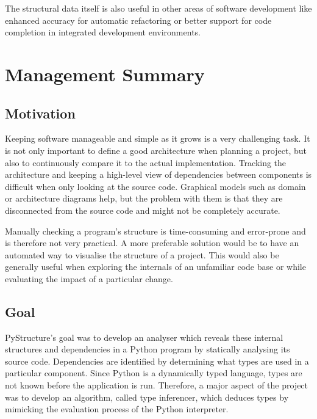 \documentclass[12pt,halfparskip,DIV11,BCOR10mm]{scrreprt}
\begin{document}
The structural data itself is also useful in other areas of software development like enhanced accuracy for automatic refactoring or better support for code completion in integrated development environments.



\chapter*{Management Summary}

\section*{Motivation}

Keeping software manageable and simple as it grows is a very challenging task. 
It is not only important to define a good architecture when planning a project, but also to continuously compare it to the actual implementation. Tracking the architecture and keeping a high-level view of dependencies between components is difficult when only looking at the source code. Graphical models such as domain or architecture diagrams help, but the problem with them is that they are disconnected from the source code and might not be completely accurate.

Manually checking a program's structure is time-consuming and error-prone and is therefore not very practical. A more preferable solution would be to have an automated way to visualise the structure of a project. This would also be generally useful when exploring the internals of an unfamiliar code base or while evaluating the impact of a particular change.

\section*{Goal}

PyStructure's goal was to develop an analyser which reveals these internal structures and dependencies in a Python program by statically analysing its source code. Dependencies are identified by determining what types are used in a particular component. Since Python is a dynamically typed language, types are not known before the application is run. Therefore, a major aspect of the project was to develop an algorithm, called type inferencer, which deduces types by mimicking the evaluation process of the Python interpreter.
\end{document}
